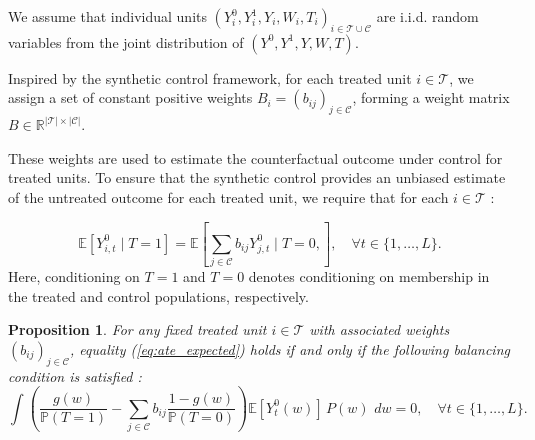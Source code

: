 \documentclass[10pt]{article} %
\newtheorem{proposition}{Proposition}
\begin{document}
{We assume that individual units $(Y_i^0, Y_i^1,Y_i, W_i, T_i)_{i \in \mathcal{T}\cup \mathcal{C}}$ are i.i.d. random variables from the joint distribution of $(Y^0, Y^1,Y, W, T)$. 
}


Inspired by the synthetic control framework, for each treated unit \( i \in \mathcal{T} \),  we assign a set of constant positive weights \( B_i = (b_{ij})_{j\in \mathcal{C}} \), forming a weight matrix \( B \in \mathbb{R}^{|\mathcal{T}| \times |\mathcal{C}|} \). 

  
These weights are used to estimate the counterfactual outcome under control for treated units.
To ensure that the synthetic control provides an unbiased estimate of the untreated outcome for each treated unit, we require that for each \( i \in \mathcal{T} \) :


\begin{equation}
\mathbb{E}[Y^0_{i,t} \mid T=1] = \mathbb{E} \left[ \sum_{j \in \mathcal{C}} b_{ij}Y^0_{j,t} \mid T=0,\right], \quad \forall t \in \{1, \dots, L \}.
\label{eq:ate_expected}
\end{equation}
Here, conditioning on \(T=1\) and \(T=0\) denotes conditioning on membership in the treated and control populations, respectively.
\begin{proposition}
    {For any fixed treated unit $i \in \mathcal{T}$ with associated weights $(b_{ij})_{j \in \mathcal{C}}$,} equality (\ref{eq:ate_expected}) holds if and only if the following balancing condition is satisfied :
\begin{equation}
\int \left( \frac{g(w)}{\mathbb{P}(T=1)} - \sum_{j\in \mathcal{C}} b_{ij} \frac{1 - g(w)}{\mathbb{P}(T=0)} \right) \mathbb{E}[Y^0_t(w)]\, P(w) \, \, dw = 0, \quad \forall t \in \{1, \dots, L \}.
\label{eq:balancing_condition}
\end{equation}
\end{proposition}
    
\end{document}
